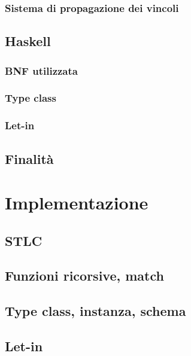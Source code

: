 \documentclass[12pt,a4paper,openright,twoside]{report}
\begin{document}
\subsection{Sistema di propagazione dei vincoli}

\section{Haskell}
\subsection{BNF utilizzata}
\subsection{Type class}
\subsection{Let-in}

\section{Finalità}

\clearpage{\pagestyle{empty}\cleardoublepage}	%


\chapter{Implementazione}		%

\lhead[\fancyplain{}{\bfseries\thepage}]{\fancyplain{}{\bfseries\rightmark}}	%


\section{STLC}

\section{Funzioni ricorsive, match}

\section{Type class, instanza, schema}

\section{Let-in}
\end{document}
